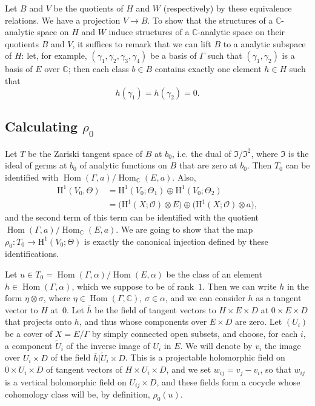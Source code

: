 \documentclass{article}
\renewcommand{\cal}[1]{{\mathcal{#1}}}
\newcommand{\fk}[1]{{\mathfrak{#1}}}
\newcommand{\CC}{\mathbb{C}}
\newcommand{\HH}{\mathrm{H}}
\DeclareMathOperator{\Hom}{Hom}
\newcommand{\oldpage}[1]{\marginpar{\footnotesize$\Big\vert$ \textit{p.~#1}}}
\begin{document}
Let $B$ and $V$ be the quotients of $H$ and $W$ (respectively) by these equivalence relations.
We have a projection $V\to B$.
To show that the structures of a $\CC$-analytic space on $H$ and $W$ induce structures of a $\CC$-analytic space on their quotients $B$ and $V$, it suffices to remark that we can lift $B$ to a analytic subspace of $H$: let, for example, $(\gamma_1,\gamma_2,\gamma_3,\gamma_4)$ be a basis of $\Gamma$ such that $(\gamma_1,\gamma_2)$ is a basis of $E$ over $\CC$; then each class $b\in B$ contains exactly one element $h\in H$ such that
\[
  h(\gamma_1) = h(\gamma_2) = 0.
\]


\subsection{Calculating \texorpdfstring{$\rho_0$}{rho0}}
\label{III.3}

Let $T$ be the Zariski tangent space of $B$ at $b_0$, i.e. the dual of $\fk{I}/\fk{I}^2$, where $\fk{I}$ is the ideal of germs at $b_0$ of analytic functions on $B$ that are zero at $b_0$.
Then $T_0$ can be identified with $\Hom(\Gamma,a)/\Hom_{\CC}(E,a)$.
Also,
\[
  \begin{aligned}
    \HH^1(V_0,\Theta)
    &= \HH^1(V_0;\Theta_1) \oplus \HH^1(V_0;\Theta_2)
  \\&= \big(\HH^1(X;\cal{O}) \otimes E\big) \oplus \big(\HH^1(X;\cal{O})\otimes a\big),
  \end{aligned}
\]
and the second term of this term can be identified with the quotient $\Hom(\Gamma,a)/\Hom_{\CC}(E,a)$.
We are going to show that the map $\rho_0\colon T_0\to\HH^1(V_0;\Theta)$ is exactly the canonical injection defined by these identifications.

Let $u\in T_0=\Hom(\Gamma,\alpha)/\Hom(E,\alpha)$ be the class of an element $h\in\Hom(\Gamma,\alpha)$, which we suppose to be of rank~$1$.
Then we can write $h$ in the form $\eta\otimes\sigma$, where $\eta\in\Hom(\Gamma,\CC)$, $\sigma\in\alpha$, and we can consider $h$ as a tangent vector to $H$ at~$0$.
Let $\overline{h}$ be the field of tangent vectors to $H\times E\times D$ at $0\times E\times D$ that projects onto $h$, and thus whose components over $E\times D$ are zero.
Let $(U_i)$
\oldpage{4-09}
be a cover of $X=E/\Gamma$ by simply connected open subsets, and choose, for each $i$, a component $\widetilde{U}_i$ of the inverse image of $U_i$ in $E$.
We will denote by $v_i$ the image over $U_i\times D$ of the field $\overline{h}|\widetilde{U}_i\times D$.
This is a projectable holomorphic field on $0\times U_i\times D$ of tangent vectors of $H\times U_i\times D$, and we set $w_{ij}=v_j-v_i$, so that $w_{ij}$ is a vertical holomorphic field on $U_{ij}\times D$, and these fields form a cocycle whose cohomology class will be, by definition, $\rho_0(u)$.
\end{document}
